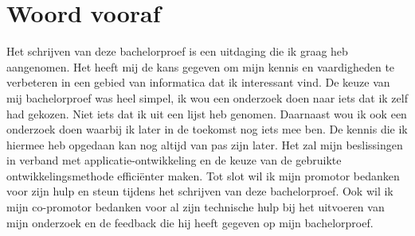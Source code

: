 
\chapter{Woord vooraf}
\label{ch:voorwoord}


Het schrijven van deze bachelorproef is een uitdaging die ik graag heb aangenomen. 
Het heeft mij de kans gegeven om mijn kennis en vaardigheden te verbeteren in een gebied van informatica dat ik interessant vind. 
De keuze van mij bachelorproef was heel simpel, ik wou een onderzoek doen naar iets dat ik zelf had gekozen. 
Niet iets dat ik uit een lijst heb genomen. Daarnaast wou ik ook een onderzoek doen waarbij ik later in de toekomst nog iets mee ben. 
De kennis die ik hiermee heb opgedaan kan nog altijd van pas zijn later. 
Het zal mijn beslissingen in verband met applicatie-ontwikkeling en de keuze van de gebruikte ontwikkelingsmethode efficiënter maken. 
Tot slot wil ik mijn promotor bedanken voor zijn hulp en steun tijdens het schrijven van deze bachelorproef. 
Ook wil ik mijn co-promotor bedanken voor al zijn technische hulp bij het uitvoeren van mijn onderzoek en de feedback die hij heeft gegeven op mijn bachelorproef.